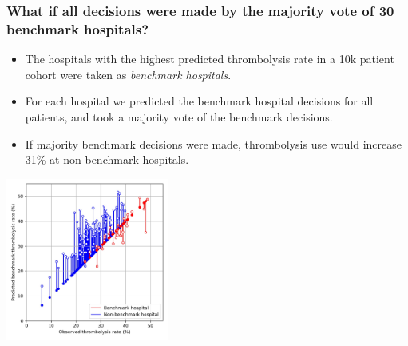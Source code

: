 \begin{frame}
\frametitle{What if all decisions were made by the majority vote of 30 benchmark hospitals?}

\footnotesize
\begin{itemize}
    \item The hospitals with the highest predicted thrombolysis rate in a 10k patient cohort were taken as \emph{benchmark hospitals}. 
    \item For each hospital we predicted the benchmark hospital decisions for all patients, and took a majority vote of the benchmark decisions.
    \item If majority benchmark decisions were made, thrombolysis use would increase 31\% at non-benchmark hospitals.
\end{itemize}

\begin{center}
\includegraphics[width=0.4\textwidth]{./images/05_benchmark_thrombolysis_key_features}
\end{center}


\end{frame}
